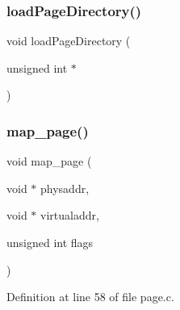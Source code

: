\subsubsection{\texorpdfstring{load\+Page\+Directory()}{loadPageDirectory()}}
{\footnotesize\ttfamily void load\+Page\+Directory (\begin{DoxyParamCaption}\item[{unsigned int $\ast$}]{ }\end{DoxyParamCaption})}

\mbox{\label{a00080_adf8c9211327b122b455fabf292cc2411_adf8c9211327b122b455fabf292cc2411}} 
\subsubsection{\texorpdfstring{map\+\_\+page()}{map\_page()}}
{\footnotesize\ttfamily void map\+\_\+page (\begin{DoxyParamCaption}\item[{void $\ast$}]{physaddr,  }\item[{void $\ast$}]{virtualaddr,  }\item[{unsigned int}]{flags }\end{DoxyParamCaption})}



Definition at line 58 of file page.\+c.


